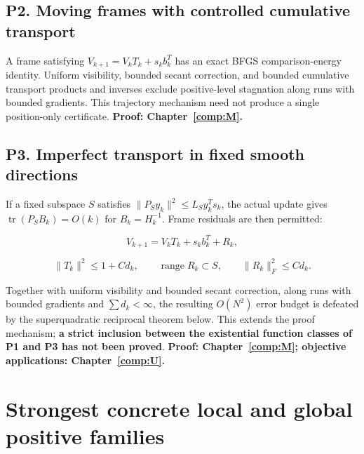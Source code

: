 

\subsection{P2. Moving frames with controlled cumulative transport}\label{p2.-moving-frames-with-controlled-cumulative-transport}

A frame satisfying \(V_{k+1}=V_kT_k+s_kb_k^T\) has an exact BFGS comparison-energy identity. Uniform visibility, bounded secant correction, and bounded cumulative transport products and inverses exclude positive-level stagnation along runs with bounded gradients. This trajectory mechanism need not produce a single position-only certificate. \textbf{Proof: Chapter~\ref{comp:M}.}



\subsection{P3. Imperfect transport in fixed smooth directions}\label{p3.-imperfect-transport-in-fixed-smooth-directions}

If a fixed subspace \(S\) satisfies \(\|P_Sy_k\|^2\le L_Sy_k^Ts_k\), the actual update gives \(\operatorname{tr}(P_SB_k)=O(k)\) for \(B_k=H_k^{-1}\). Frame residuals are then permitted:

\[V_{k+1}=V_kT_k+s_kb_k^T+R_k,\]

\[\|T_k\|^2\le1+Cd_k,\qquad \operatorname{range}R_k\subset S,
\qquad\|R_k\|_F^2\le Cd_k.\]

Together with uniform visibility and bounded secant correction, along runs with bounded gradients and \(\sum d_k<\infty\), the resulting \(O(N^2)\) error budget is defeated by the superquadratic reciprocal theorem below. This extends the proof mechanism; \textbf{a strict inclusion between the existential function classes of P1 and P3 has not been proved}. \textbf{Proof: Chapter~\ref{comp:M}; objective applications: Chapter~\ref{comp:U}.}



\section{Strongest concrete local and global positive families}\label{strongest-concrete-local-and-global-positive-families}




